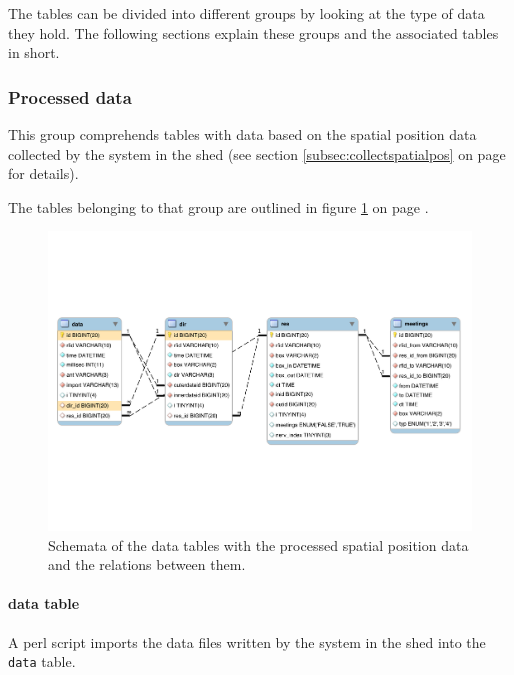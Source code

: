 The tables can be divided into different groups by looking at the type of data they hold. The following sections explain these groups and the associated tables in short.

\subsubsection{Processed data}

This group comprehends tables with data based on the spatial position data collected by the system in the shed (see section \ref{subsec:collectspatialpos} on page \pageref{subsec:collectspatialpos} for details).

The tables belonging to that group are outlined in figure \ref{fig:processed_data_schema} on page \pageref{fig:processed_data_schema}.
 
\begin{figure}[htpb]
\begin{center}
  \includegraphics[width=\textwidth]{assets/pdf/processed_data_schema.pdf}
  \caption[Schema of database tables with processed data]{Schemata of the data tables with the processed spatial position data and the relations between them.}
  \label{fig:processed_data_schema}
\end{center}
\end{figure}

\paragraph{data table}
\label{para:data_table}

A \ac{perl} script imports the data files written by the system in the shed into the \lstinline|data| table. 

